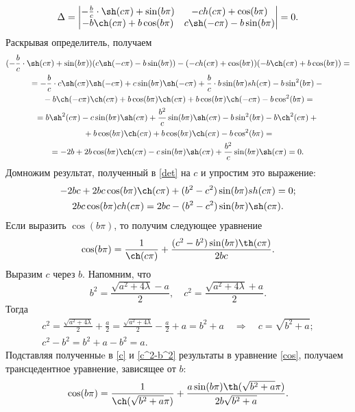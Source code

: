\documentclass[12pt, a4paper]{article}
\begin{document}
\[
\Delta = 
\begin{vmatrix}
-\frac{b}{c}\cdot \sh(c\pi) +\sin(b\pi) & -ch(c\pi)+\cos(b\pi) \\
-b\ch(c\pi)+b\cos(b\pi) & c\sh(-c\pi)-b\sin(b\pi)
\end{vmatrix} =0.
\]
Раскрывая определитель, получаем
\begin{multline} \label{det}
(-\frac{b}{c}\cdot \sh(c\pi) +\sin(b\pi))(c\sh(-c\pi)-b\sin(b\pi)) - (-ch(c\pi)+\cos(b\pi))(-b\ch(c\pi)+b\cos(b\pi)) = \\
= -\frac{b}{c}\cdot c \sh(c\pi)\sh(-c\pi) + c\sin(b\pi)\sh(-c\pi)+\frac{b}{c}\cdot b\sin(b\pi)sh(c\pi) - b\sin^2 (b\pi) - {}\\ 
{} - b \ch(-c\pi)\ch(c\pi) +b\cos(b\pi)\ch(c\pi) + b\cos(b\pi)\ch(-c\pi) - b\cos^2(b\pi) = \\ 
=b\sh^2(c\pi) - c\sin(b\pi)\sh(c\pi) + \frac{b^2}{c}\sin(b\pi)\sh(c\pi) - b\sin^2(b\pi) - b\ch^2(c\pi) + {} \\{} + b\cos(b\pi)\ch(c\pi)+  b\cos(b\pi)\ch(c\pi) - b\cos^2(b\pi) = \\ =
-2b + 2b\cos(b\pi)\ch(c\pi) - c\sin(b\pi)\sh(c\pi)+\frac{b^2}{c}\sin(b\pi)\sh(c\pi) = 0.
\end{multline}
Домножим результат, полученный в \eqref{det} на $c$ и упростим это выражение:
\begin{gather*}
-2bc + 2bc\cos(b\pi)\ch(c\pi) + (b^2-c^2)\sin(b\pi)sh(c\pi) = 0;\\
2bc\cos(b\pi)ch(c\pi) = 2bc - (b^2-c^2)\sin(b\pi)\sh(c\pi).
\end{gather*}
Если выразить $\cos(b\pi)$, то получим следующее уравнение
\begin{equation}
\cos(b\pi)=\frac{1}{\ch(c\pi)} + \frac{(c^2-b^2)\sin(b\pi)\th(c\pi)}{2bc}. \label{cos}
\end{equation}
Выразим $c$ через $b$. Напомним, что
\[
b^2 = \frac{\sqrt{a^2+4\lambda}-a}{2}, \quad
c^2 = \frac{\sqrt{a^2+4\lambda}+a}{2}.
\]
Тогда
\begin{gather}
c^2 = \frac{\sqrt{a^2+4\lambda}}{2} + \frac{a}{2} = \frac{\sqrt{a^2+4\lambda}}{2} - \frac{a}{2} +a = b^2 +a \quad \Rightarrow \quad c=\sqrt{b^2+a}; \label{c}\\ 
c^2 - b^2 = b^2 +a -b^2 = a. \label{c^2-b^2}
\end{gather}
 Подставляя полученныe в \eqref{c} и \eqref{c^2-b^2} результаты в уравнение \eqref{cos}, получаем трансце\-дент\-ное уравнение, зависящее от $b$:
 \begin{equation}
 \cos(b\pi)=\frac{1}{\ch(\sqrt{b^2+a}\pi)} + \frac{a\sin(b\pi)\th(\sqrt{b^2+a}\pi)}{2b\sqrt{b^2+a}}. \label{cos!}
\end{equation}
\end{document}

